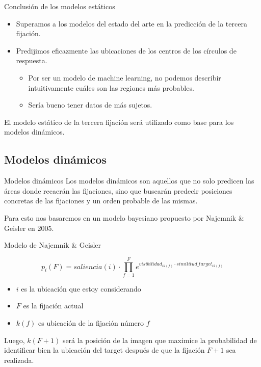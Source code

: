 \documentclass[compress]{beamer}
\begin{document}
\begin{frame}{Conclusión de los modelos estáticos}
\begin{itemize}
\item Superamos a los modelos del estado del arte en la predicción de la tercera fijación.
\item Predijimos eficazmente las ubicaciones de los centros de los círculos de respuesta.
\begin{itemize}
\item Por ser un modelo de machine learning, no podemos describir intuitivamente cuáles son las regiones más probables.
\item Sería bueno tener datos de más sujetos.
\end{itemize}
\end{itemize}

\bigskip

El modelo estático de la tercera fijación será utilizado como base para los modelos dinámicos.
\end{frame}

\subsection{Modelos dinámicos}
\begin{frame}{Modelos dinámicos}
Los modelos dinámicos son aquellos que no solo predicen las áreas donde
recaerán las fijaciones, sino que buscarán predecir posiciones concretas de las fijaciones y un orden probable de las mismas.

\bigskip

Para esto nos basaremos en un modelo bayesiano propuesto por Najemnik \& Geisler en 2005. 
\end{frame}

\begin{frame}{Modelo de Najemnik \& Geisler}

$$p_{i}(F) = saliencia(i) \cdot \prod_{f=1}^F e^{visibilidad_{i k(f)} \cdot similitud\_target_{ik(f)}}$$

{ \footnotesize
\begin{itemize}
\item $i$ es la ubicación que estoy considerando
\item $F$ es la fijación actual
\item $k(f)$ es ubicación de la fijación número $f$
\end{itemize}
}

\bigskip

Luego, $k(F+1)$ será la posición de la imagen que maximice la probabilidad de identificar bien la ubicación del target después de que la fijación $F+1$ sea realizada.
\end{frame}
\end{document}
